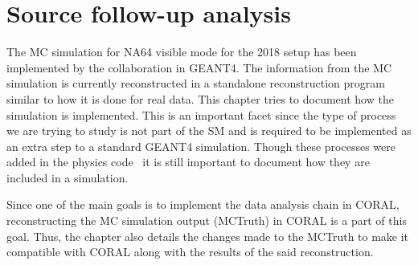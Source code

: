 
\chapter{Source follow-up analysis}
\label{sec:MC}
The MC simulation for NA64 visible mode for the 2018 setup has been implemented by the collaboration in GEANT4. The information from the MC simulation is currently reconstructed in a standalone reconstruction program similar to how it is done for real data. This chapter tries to document how the simulation is implemented. This is an important facet since the type of process we are trying to study is not part of the SM and is required to be implemented as an extra step to a standard GEANT4 simulation. Though these processes were added in the physics code~\cite{Gninenko:2017yus,PhysRevD.97.072002} it is still important to document how they are included in a simulation.

Since one of the main goals is to implement the data analysis chain in CORAL, reconstructing the MC simulation output (MCTruth) in CORAL is a part of this goal. Thus, the chapter also details the changes made to the MCTruth to make it compatible with CORAL along with the results of the said reconstruction.

